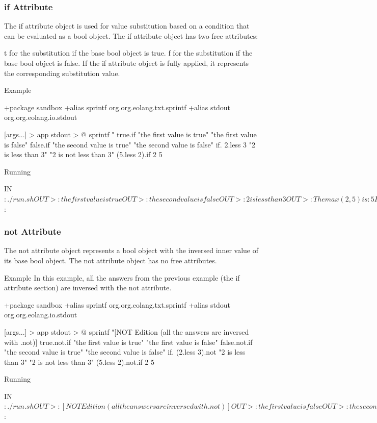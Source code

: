 \documentclass[12pt]{book}
\begin{document}
\subsubsection{if Attribute}
The if attribute object is used for value substitution based on a condition that can be evaluated as a bool object.
The if attribute object has two free attributes:

t for the substitution if the base bool object is true.
f for the substitution if the base bool object is false.
If the if attribute object is fully applied, it represents the corresponding substitution value.

Example
\begin{ffcode}
+package sandbox
+alias sprintf org.org.eolang.txt.sprintf
+alias stdout org.org.eolang.io.stdout

[args...] > app
  stdout > @
    sprintf
      "%
      true.if
        "the first value is true"
        "the first value is false"
      false.if
        "the second value is true"
        "the second value is false"
      if.
        2.less 3
        "2 is less than 3"
        "2 is not less than 3"
      (5.less 2).if
        2
        5

Running

IN$: ./run.sh
OUT>: the first value is true
OUT>: the second value is false
OUT>: 2 is less than 3
OUT>: The max(2, 5) is: 5
IN$: 
\end{ffcode}

\subsubsection{not Attribute}
The not attribute object represents a bool object with the inversed inner value of its base bool object.
The not attribute object has no free attributes.

Example
In this example, all the answers from the previous example (the if attribute section) are inversed with the not attribute.

\begin{ffcode}
+package sandbox
+alias sprintf org.org.eolang.txt.sprintf
+alias stdout org.org.eolang.io.stdout

[args...] > app
  stdout > @
    sprintf
      "[NOT Edition (all the answers are inversed with
      .not)]\n%
      true.not.if
        "the first value is true"
        "the first value is false"
      false.not.if
        "the second value is true"
        "the second value is false"
      if.
        (2.less 3).not
        "2 is less than 3"
        "2 is not less than 3"
      (5.less 2).not.if
        2
        5

Running

IN$: ./run.sh
OUT>: [NOT Edition (all the answers are inversed with
.not)]
OUT>: the first value is false
OUT>: the second value is true
OUT>: 2 is not less than 3
OUT>: The max(2, 5) is: 2
IN$: 
\end{ffcode}
\end{document}
